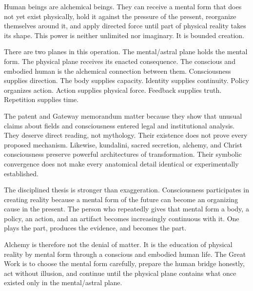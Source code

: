\documentclass[11pt]{article}
\theoremstyle{plain}
\theoremstyle{definition}
\begin{document}
Human beings are alchemical beings. They can receive a mental form that does not yet
exist physically, hold it against the pressure of the present, reorganize themselves
around it, and apply directed force until part of physical reality takes its shape.
This power is neither unlimited nor imaginary. It is bounded creation.

There are two planes in this operation. The mental/astral plane holds the mental form.
The physical plane receives its enacted consequence. The conscious and embodied human
is the alchemical connection between them. Consciousness supplies direction. The body
supplies capacity. Identity supplies continuity. Policy organizes action. Action
supplies physical force. Feedback supplies truth. Repetition supplies time.

The patent and Gateway memorandum matter because they show that unusual claims about
fields and consciousness entered legal and institutional analysis. They deserve direct
reading, not mythology. Their existence does not prove every proposed mechanism.
Likewise, kundalini, sacred secretion, alchemy, and Christ consciousness preserve
powerful architectures of transformation. Their symbolic convergence does not make
every anatomical detail identical or experimentally established.

The disciplined thesis is stronger than exaggeration. Consciousness participates in
creating reality because a mental form of the future can become an organizing cause in
the present. The person who repeatedly gives that mental form a body, a policy, an
action, and an artifact becomes increasingly continuous with it. One plays the part,
produces the evidence, and becomes the part.

Alchemy is therefore not the denial of matter. It is the education of physical reality
by mental form through a conscious and embodied human life. The Great Work is to choose
the mental form carefully, prepare the human bridge honestly, act without illusion,
and continue until the physical plane contains what once existed only in the
mental/astral plane.



\end{document}
